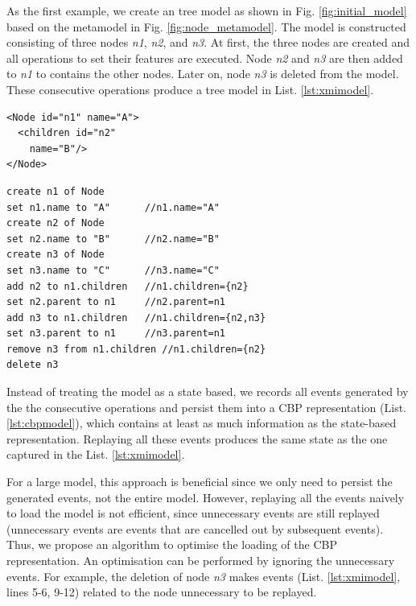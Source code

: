 \documentclass{llncs}
\begin{document}
As the first example, we create an tree model as shown in Fig. \ref{fig:initial_model} based on the metamodel in Fig. \ref{fig:node_metamodel}. The model is constructed consisting of three nodes \emph{n1}, \emph{n2}, and \emph{n3}. At first, the three nodes are created and  all operations to set their features are executed. Node \emph{n2} and \emph{n3} are then added to \emph{n1} to contains the other nodes. Later on, node \emph{n3} is deleted from the model. These consecutive operations produce a tree model in List. \ref{lst:xmimodel}.

\noindent
\begin{minipage}[t]{0.34\linewidth}
\begin{lstlisting}[style=xmi,caption={State-based representation of the model in Figure \ref{fig:initial_model} after removal of node \emph{n3} in (simplified) XMI.},label=lst:xmimodel]
<Node id="n1" name="A">
  <children id="n2" 
    name="B"/>
</Node>
\end{lstlisting}
\end{minipage}
\hfill
\begin{minipage}[t]{0.635\linewidth}
\begin{lstlisting}[style=eol,caption={Change-based representation of the model in Figure \ref{fig:initial_model} after removal of node \emph{n3}.},label=lst:cbpmodel]
create n1 of Node
set n1.name to "A"      //n1.name="A"
create n2 of Node
set n2.name to "B"      //n2.name="B"
create n3 of Node
set n3.name to "C"      //n3.name="C"
add n2 to n1.children   //n1.children={n2}
set n2.parent to n1     //n2.parent=n1
add n3 to n1.children   //n1.children={n2,n3}
set n3.parent to n1     //n3.parent=n1
remove n3 from n1.children //n1.children={n2}
delete n3
\end{lstlisting}
\end{minipage}

Instead of treating the model as a state based, we records all events generated by the the consecutive  operations and persist them into a CBP representation (List. \ref{lst:cbpmodel}), which contains at least as much information as the state-based representation. Replaying all these events produces the same state as the one captured in the List. \ref{lst:xmimodel}.  

For a large model, this approach is beneficial since we only need to persist the generated events, not the entire model. However, replaying all the events naively to load the model is not efficient, since unnecessary events are still replayed (unnecessary events are events that are cancelled out by subsequent events). Thus, we propose an algorithm to optimise the loading of the CBP representation. An optimisation can be performed by ignoring the unnecessary events. For example, the deletion of node \emph{n3} makes events (List. \ref{lst:xmimodel}, lines 5-6, 9-12) related to the node unnecessary to be replayed. 
\end{document}
